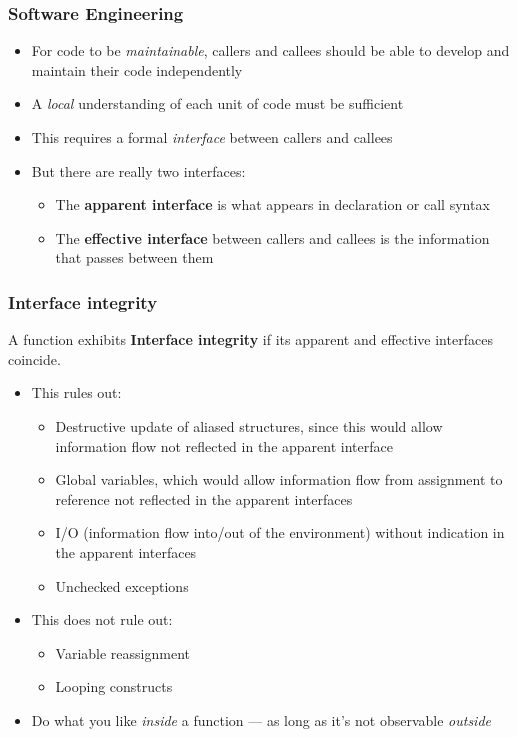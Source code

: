 \documentclass[12pt]{beamer}
\begin{document}
\begin{frame}
\frametitle{Software Engineering}
\begin{itemize}
\item For code to be \emph{maintainable}, callers and callees should be
  able to develop and maintain their code independently
\item A \emph{local} understanding of each unit of code must be sufficient
\item This requires a formal \emph{interface} between callers and callees
\item But there are really two interfaces:
  \begin{itemize}
  \item The \textbf{apparent interface} is what appears in declaration
    or call syntax
  \item The \textbf{effective interface} between callers and
    callees is the information that passes between them
  \end{itemize}
\end{itemize}

\end{frame}


\begin{frame}
\frametitle{Interface integrity}

A function exhibits \textbf{Interface integrity} if its apparent and
effective interfaces coincide.

\begin{itemize}
\item This rules out:
  \begin{itemize}
  \item Destructive update of aliased structures, since this would allow
    information flow not reflected in the apparent interface
  \item Global variables, which would allow information flow from
    assignment to reference not reflected in the apparent interfaces
  \item I/O (information flow into/out of the environment) without
    indication in the apparent interfaces
  \item Unchecked exceptions
  \end{itemize}
\item This does not rule out:
  \begin{itemize}
  \item Variable reassignment
  \item Looping constructs
  \end{itemize}
\item Do what you like \emph{inside} a function --- as long as it's not
  observable \emph{outside}
\end{itemize}

\end{frame}
\end{document}
